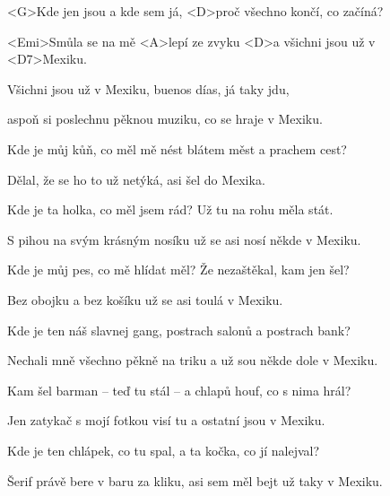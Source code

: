 

\zs
<G>Kde jen jsou a kde sem já, <D>proč všechno končí, co začíná?

<Emi>Smůla se na mě <A>lepí ze zvyku <D>a všichni jsou už 
v <D7>Mexiku.
\ks

\zr
Všichni jsou už v Mexiku, buenos días, já taky jdu,

aspoň si poslechnu pěknou muziku, co se hraje v Mexiku.
\kr

\zs
Kde je můj kůň, co měl mě nést blátem měst a prachem cest?

Dělal, že se ho to už netýká, asi šel do Mexika.
\ks

\zs
Kde je ta holka, co měl jsem rád? Už tu na rohu měla stát.

S pihou na svým krásným nosíku už se asi nosí někde v Mexiku.
\ks

\zr
\kr

\zs
Kde je můj pes, co mě hlídat měl? Že nezaštěkal, kam jen šel?

Bez obojku a bez košíku už se asi toulá v Mexiku.
\ks

\zs
Kde je ten náš slavnej gang, postrach salonů a postrach bank?

Nechali mně všechno pěkně na triku a už sou někde dole v Mexiku.
\ks

\zr
\kr



\zs
Kam šel barman -- teď tu stál -- a chlapů houf, co s nima hrál?

Jen zatykač s mojí fotkou visí tu a ostatní jsou v Mexiku.
\ks

\zs
Kde je ten chlápek, co tu spal, a ta kočka, co jí nalejval?

Šerif právě bere v baru za kliku, asi sem měl bejt už taky v Mexiku.
\ks

\zr\kr \zr\kr


\kp
